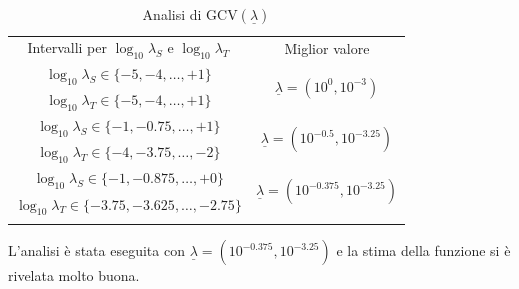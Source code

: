 \documentclass[a4paper,11pt,twoside,openright]{book}							%
\begin{document}
\begin{table}[htbp]
\renewcommand{\arraystretch}{1.3}
\setlength{\tabcolsep}{2mm}
\centering
	\begin{tabular}{!{\vrule width 1.2pt}c!{\vrule width 1.2pt}c!{\vrule width 1.2pt}}
	Intervalli per $\log_{10}\lambda_S$ e $\log_{10}\lambda_T$& Miglior valore											\\
	$\log_{10}\lambda_S \in \{-5,-4,\ldots,+1\}$ 	&  			\\
	$\log_{10}\lambda_T \in \{-5,-4,\ldots,+1\}$		& 															\\	
	$\log_{10}\lambda_S \in \{-1,-0.75,\ldots,+1\}$ 	&  		\\
	$\log_{10}\lambda_T \in \{-4,-3.75,\ldots,-2\}$	& 															\\	
	$\log_{10}\lambda_S \in \{-1,-0.875,\ldots,+0\}$ 	& 	\\
	$\log_{10}\lambda_T \in \{-3.75,-3.625,\ldots,-2.75\}$		& 												\\	
	\end{tabular}
\caption{Analisi di $\mathrm{GCV}(\underline \lambda)$}
\label{tab:DomC}
\end{table}

L'analisi è stata eseguita con $\underline \lambda = (10^{-0.375}, 10^{-3.25})$ e la stima della funzione si è rivelata molto buona.
\end{document}
